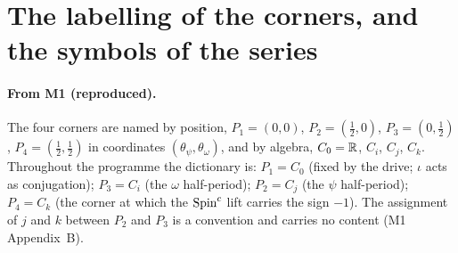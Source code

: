 
\section{The labelling of the corners, and the symbols of the series}\label{app:labels}

\paragraph{From M1 (reproduced).}
The four corners are named by position, $P_{1}=(0,0)$, $P_{2}=(\tfrac12,0)$,
$P_{3}=(0,\tfrac12)$, $P_{4}=(\tfrac12,\tfrac12)$ in coordinates
$(\theta_{\psi},\theta_{\omega})$, and by algebra, $C_{0}=\mathbb{R}$, $C_{i}$,
$C_{j}$, $C_{k}$. Throughout the programme the dictionary is: $P_{1}=C_{0}$
(fixed by the drive; $\iota$ acts as conjugation); $P_{3}=C_{i}$ (the
$\omega$ half-period); $P_{2}=C_{j}$ (the $\psi$ half-period); $P_{4}=C_{k}$
(the corner at which the $\text{Spin}^c$ lift carries the sign $-1$). The assignment
of $j$ and $k$ between $P_{2}$ and $P_{3}$ is a convention and carries no
content (M1 Appendix~B).

